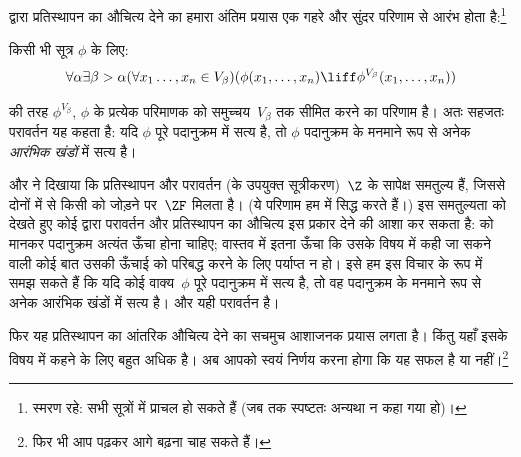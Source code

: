 \documentclass[../../../include/open-logic-section]{subfiles}
\begin{document}

\stagesinex{} द्वारा प्रतिस्थापन का औचित्य देने का हमारा अंतिम प्रयास एक
गहरे और सुंदर परिणाम से आरंभ होता है:\footnote{स्मरण रहे: सभी सूत्रों में
प्राचल हो सकते हैं (जब तक स्पष्टतः अन्यथा न कहा गया हो)।}
\begin{thm}[परावर्तन योजना]
किसी भी सूत्र $\phi$ के लिए:
\[
\forall \alpha \exists \beta > \alpha (\forall x_1 \ldots, x_n \in
V_\beta)(\phi(x_1, \ldots, x_n) \liff \phi^{V_\beta}(x_1, \ldots, x_n))
\]
\end{thm}
\noindent 
{} की तरह
$\phi^{V_\beta}$, $\phi$ के प्रत्येक परिमाणक को समुच्चय~$V_\beta$ तक सीमित
करने का परिणाम है। अतः सहजतः परावर्तन यह कहता है: यदि $\phi$ पूरे पदानुक्रम
में सत्य है, तो $\phi$ पदानुक्रम के मनमाने रूप से अनेक \emph{आरंभिक खंडों}
में सत्य है।

\citet{Montague1961} और \citet{Levy1960} ने दिखाया कि प्रतिस्थापन और
परावर्तन (के उपयुक्त सूत्रीकरण)~$\Z$ के सापेक्ष समतुल्य हैं, जिससे दोनों में
से किसी को जोड़ने पर~$\ZF$ मिलता है। (ये परिणाम हम
 में सिद्ध करते हैं।) इस समतुल्यता
को देखते हुए कोई \stagesinex{} द्वारा परावर्तन और प्रतिस्थापन का औचित्य इस
प्रकार देने की आशा कर सकता है: \stagesinex{} को मानकर पदानुक्रम अत्यंत ऊँचा
होना चाहिए; वास्तव में इतना ऊँचा कि उसके विषय में कही जा सकने वाली कोई बात
उसकी ऊँचाई को परिबद्ध करने के लिए पर्याप्त न हो। इसे हम इस विचार के रूप में
समझ सकते हैं कि यदि कोई वाक्य~$\phi$ पूरे पदानुक्रम में सत्य है, तो वह
पदानुक्रम के मनमाने रूप से अनेक आरंभिक खंडों में सत्य है। और यही परावर्तन है।

फिर यह प्रतिस्थापन का आंतरिक औचित्य देने का सचमुच आशाजनक प्रयास लगता है।
किंतु यहाँ इसके विषय में कहने के लिए बहुत अधिक है। अब आपको स्वयं निर्णय करना
होगा कि यह सफल है या नहीं।\footnote{फिर भी आप
\citet[95--100]{Incurvati2020} पढ़कर आगे बढ़ना चाह सकते हैं।}
\end{document}

